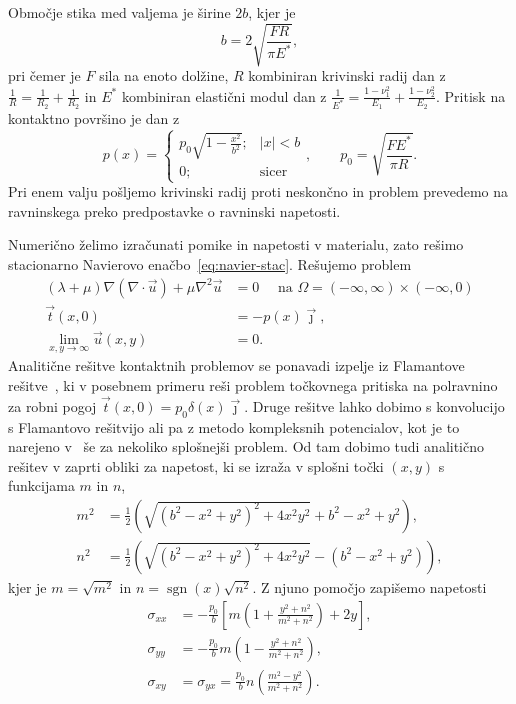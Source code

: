 \documentclass[12pt,a4paper,twoside]{article}
\theoremstyle{definition} %
\theoremstyle{plain} %
\numberwithin{equation}{section}
\newcommand{\vt}{\vec{t}}
\newcommand{\vu}{\vec{u}}
\newcommand{\vj}{\vec{\jmath}}
\DeclareMathOperator{\sgn}{sgn}
\begin{document}
Območje stika med valjema je širine $2b$, kjer je
\begin{equation}
  b = 2\sqrt{\frac{F R}{\pi E^\ast}},
\end{equation}
pri čemer je $F$ sila na enoto dolžine, $R$ kombiniran krivinski radij dan z $\frac1R = \frac1{R_2}
+ \frac1{R_2}$ in $E^\ast$ kombiniran elastični modul dan z $\frac{1}{E^\ast} = \frac{1-\nu_1^2}{E_1}
+ \frac{1-\nu_2^2}{E_2}$. Pritisk na kontaktno površino je dan z
\begin{equation}
  p(x) = \begin{cases}
    p_0 \sqrt{1-\frac{x^2}{b^2}}; & |x| < b \\
    0; & \text{sicer}
  \end{cases}, \qquad p_0 = \sqrt{\frac{FE^\ast}{\pi R}}.
\end{equation}
Pri enem valju pošljemo krivinski radij proti
neskončno in problem prevedemo na ravninskega preko predpostavke o ravninski napetosti.

Numerično želimo izračunati pomike in napetosti v materialu, zato rešimo stacionarno Navierovo
enačbo~\eqref{eq:navier-stac}. Rešujemo problem
\begin{align}
  (\lambda + \mu) \nabla(\nabla\cdot \vu) + \mu \nabla^2 \vu &= 0 \quad \text{ na } \Omega =
  (-\infty, \infty) \times (-\infty, 0) \nonumber \\
  \vt(x, 0) &= -p(x)\vj, \label{eq:hertzian-problem}  \\
  \lim_{x, y\to\infty} \vu(x, y) &= 0. \nonumber
\end{align}
Analitične rešitve kontaktnih problemov se ponavadi izpelje iz Flamantove
rešitve~\cite[str.~294]{slaughter2012linearized}, ki v posebnem primeru reši problem
točkovnega pritiska na polravnino za robni pogoj $\vt(x, 0) = p_0\delta(x)\vj$. Druge rešitve lahko
dobimo s konvolucijo s Flamantovo rešitvijo ali pa z metodo kompleksnih potencialov, kot je to
narejeno v~\cite{mcewen1949stresses} še za nekoliko splošnejši problem. Od tam dobimo tudi
analitično rešitev v zaprti obliki za napetost, ki se izraža v splošni točki $(x, y)$ s funkcijama
$m$ in $n$,
\begin{align}
  m^2 &= \frac{1}{2} \left(\sqrt{\left(b^2-x^2+y^2\right)^2+4 x^2 y^2}+b^2-x^2+y^2\right), \\
  n^2 &= \frac{1}{2} \left(\sqrt{\left(b^2-x^2+y^2\right)^2+4 x^2 y^2}-(b^2-x^2+y^2)\right),
\end{align}
kjer je $m=\sqrt{m^2}$ in $n=\sgn(x)\sqrt{n^2}$. Z njuno pomočjo zapišemo napetosti
\begin{align}
  \sigma_{xx} &= -\frac{p_0}{b}\left[m\left(1 + \frac{y^2 + n^2}{m^2 + n^2}\right)+2y\right], \\
  \sigma_{yy} &= -\frac{p_0}{b}m\left(1 - \frac{y^2 + n^2}{m^2 + n^2}\right), \\
  \sigma_{xy} &= \sigma_{yx} = \frac{p_0}{b}n\left(\frac{m^2 - y^2}{m^2 + n^2}\right).
\end{align}
\end{document}
